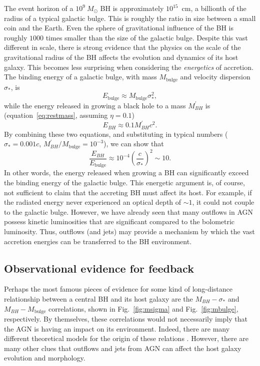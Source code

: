 The event horizon of a $10^9~M_\odot$ BH is approximately 
$10^{15}$~cm, a billionth of the radius of a typical galactic bulge. This is 
roughly the ratio in size between a small coin and the 
Earth. Even the sphere of gravitational influence of the BH is roughly 
$1000$ times smaller than the size of the galactic bulge.
Despite this vast different in scale, there is strong evidence
that the physics on the scale of the gravitational
radius of the BH affects the evolution and dynamics of its host galaxy.
This becomes less surprising when considering the {\em energetics} of accretion.
The binding energy of a galactic bulge, with mass 
$M_{\mathrm{bulge}}$ and velocity dispersion $\sigma_*$, is 
\begin{equation}
E_{\mathrm{bulge}} \approx M_{\mathrm{bulge}} \sigma_*^2,
\end{equation} 
while the energy released in growing a black hole to a 
mass $M_{BH}^\prime$ is (equation~\ref{eq:restmass}, assuming $\eta=0.1$)
\begin{equation}
E_{BH} \approx 0.1 M_{BH}^\prime c^2.  
\end{equation}
By combining these two equations, and substituting in typical numbers 
($\sigma_* = 0.001c$, $M_{BH}^\prime / M_{\mathrm{bulge}} = 10^{-3}$), we can show that 
\begin{equation}
\frac{E_{BH}}{E_{\mathrm{bulge}}} \approx 10^{-4} \left( \frac{c}{\sigma_*} \right)^2 \sim 10.
\end{equation}
In other words, the energy released when growing a BH can significantly exceed
the binding energy of the galactic bulge. This energetic 
argument is, of course, not sufficient to claim that the accreting BH must affect its
host. For example, if the radiated energy never experienced an 
optical depth of $\sim 1$, it could not couple to the galactic bulge. However,
we have already seen that many outflows in AGN possess kinetic luminosities that
are significant compared to the bolometric luminosity. Thus, outflows 
(and jets) may provide a mechanism by which the vast accretion energies can
be transferred to the BH environment.

\subsection{Observational evidence for feedback}

Perhaps the most famous pieces of evidence for some kind of long-distance 
relationship between a central BH and its host galaxy are the 
$M_{BH}-\sigma_*$ \citep{ferrarese2000,gebhardt2000,gultekin2009} and $M_{BH}-M_{\mathrm{bulge}}$ 
\citep{magorrian1998,haring2004,mcconnell2013} correlations, 
shown in Fig.~\ref{fig:msigma} and Fig.~\ref{fig:mbulge}, respectively.
By themselves, these correlations would not necessarily imply
that the AGN is having an impact on its environment. Indeed, there are many different
theoretical models for the origin of these relations 
\citep[e.g][]{somerville2001,adams2001,burkert2001,king2003,croton2006,kormendy2013}. 
However, there are many other clues that outflows and jets from AGN can affect
the host galaxy evolution and morphology.

